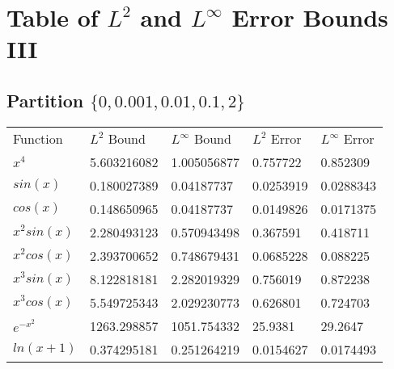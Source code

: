

%
\chapter*{\thechapter \quad Table of $L^2$ and $L^{\infty}$ Error Bounds III}
\label{appendixE}

\section{Partition $\{0,0.001,0.01,0.1,2\}$}
\begin{tabular}{lllll}
Function    & $L^2$ Bound & $L^{\infty}$ Bound & $L^2$ Error          & $L^{\infty}$ Error\\
%
$x^4$       & 5.603216082 & 1.005056877            & 0.757722     & 0.852309   \\
$sin(x)$    & 0.180027389  & 0.04187737         & 0.0253919     & 0.0288343  \\
$cos(x)$    & 0.148650965  & 0.04187737         & 0.0149826 & 0.0171375  \\
$x^2sin(x)$ & 2.280493123 & 0.570943498        & 0.367591     & 0.418711   \\
$x^2cos(x)$ & 2.393700652 & 0.748679431        & 0.0685228     & 0.088225     \\
$x^3sin(x)$ & 8.122818181 & 2.282019329        & 0.756019     & 0.872238   \\
$x^3cos(x)$ & 5.549725343 & 2.029230773        & 0.626801     & 0.724703   \\
$e^{-x^2}$  & 1263.298857 & 1051.754332           & 25.9381     & 29.2647   \\
$ln(x+1)$   & 0.374295181 &  0.251264219         & 0.0154627 & 0.0174493 
\end{tabular}
